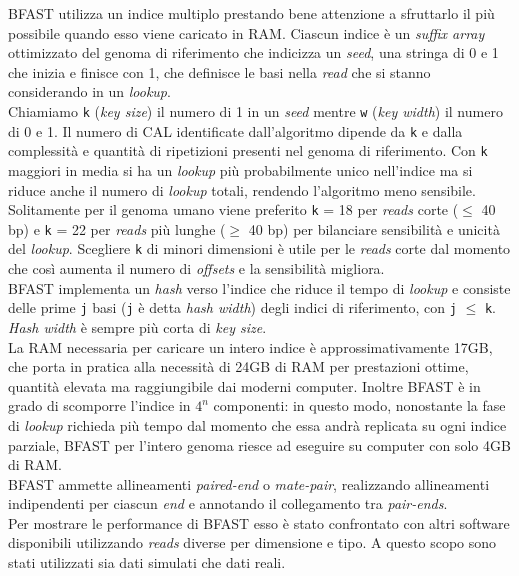 \documentclass[conference]{IEEEtran}
\begin{document}
	BFAST utilizza un indice multiplo prestando bene attenzione a sfruttarlo il più possibile quando esso viene caricato in RAM.
	Ciascun indice è un \textit{suffix array} ottimizzato del genoma di riferimento che indicizza un \textit{seed}, una stringa di 0 e 1 che inizia e finisce con 1, che definisce le basi nella \textit{read} che si stanno considerando in un \textit{lookup}.\\
Chiamiamo \texttt{k} (\textit{key size}) il numero di 1 in un \textit{seed} mentre \texttt{w} (\textit{key width}) il numero di 0 e 1. Il numero di CAL identificate dall'algoritmo dipende da \texttt{k} e dalla complessità e quantità di ripetizioni presenti nel genoma di riferimento. Con \texttt{k} maggiori in media si ha un \textit{lookup} più probabilmente unico nell'indice ma si riduce anche il numero di \textit{lookup} totali, rendendo l'algoritmo meno sensibile.\\
Solitamente per il genoma umano viene preferito \texttt{k} = 18 per \textit{reads} corte ($\le$ 40 bp) e \texttt{k} = 22 per \textit{reads} più lunghe ($\ge$ 40 bp) per bilanciare sensibilità e unicità del \textit{lookup}. Scegliere \texttt{k} di minori dimensioni è utile per le \textit{reads} corte dal momento che così aumenta il numero di \textit{offsets} e la sensibilità migliora.\\
BFAST implementa un \textit{hash} verso l'indice che riduce il tempo di \textit{lookup} e consiste delle prime \texttt{j} basi (\texttt{j} è detta \textit{hash width}) degli indici di riferimento, con \texttt{j} $\le$ \texttt{k}. \textit{Hash width} è sempre più corta di \textit{key size}.\\

La RAM necessaria per caricare un intero indice è approssimativamente 17GB, che porta in pratica alla necessità di 24GB di RAM per prestazioni ottime, quantità elevata ma raggiungibile dai moderni computer. Inoltre BFAST è in grado di scomporre l'indice in $4^n$ componenti: in questo modo, nonostante la fase di \textit{lookup} richieda più tempo dal momento che essa andrà replicata su ogni indice parziale, BFAST per l'intero genoma riesce ad eseguire su computer con solo 4GB di RAM.\\

BFAST ammette allineamenti \textit{paired-end} o \textit{mate-pair}, realizzando allineamenti indipendenti per ciascun \textit{end} e annotando il collegamento tra \textit{pair-ends}.\\


Per mostrare le performance di BFAST esso è stato confrontato con altri software disponibili utilizzando \textit{reads} diverse per dimensione e tipo. A questo scopo sono stati utilizzati sia dati simulati che dati reali.\\
\end{document}
